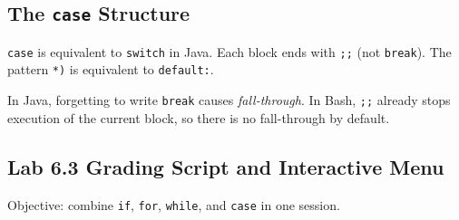 \subsection*{The \texttt{case} Structure}

\texttt{case} is equivalent to \texttt{switch} in Java. Each block ends with
\texttt{;;} (not \texttt{break}). The pattern \texttt{*)} is equivalent to
\texttt{default:}.

\begin{notebox}
In Java, forgetting to write \texttt{break} causes \textit{fall-through}. In
Bash, \texttt{;;} already stops execution of the current block, so there is no
fall-through by default.
\end{notebox}

\subsection*{Lab 6.3 Grading Script and Interactive Menu}

Objective: combine \texttt{if}, \texttt{for}, \texttt{while}, and
\texttt{case} in one session.

